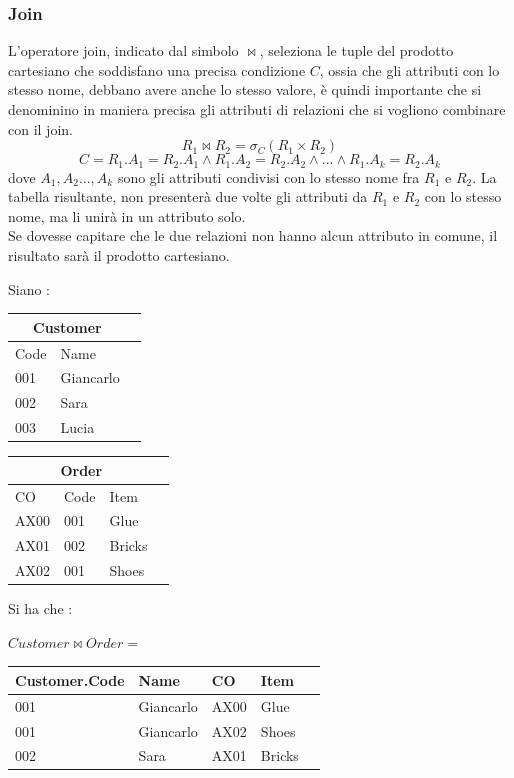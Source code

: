 \documentclass[12pt, letterpaper]{article}
\begin{document}
 \subsubsection{Join}
 L'operatore join, indicato dal simbolo \(\Join \), seleziona le tuple del prodotto cartesiano 
 che soddisfano una precisa condizione \(C\), ossia che gli attributi con lo stesso nome, debbano 
 avere anche lo stesso valore, è quindi importante che si denominino in maniera precisa gli attributi 
 di relazioni che si vogliono combinare con il join.\begin{equation}
    R_1\Join R_2 = \sigma_C(R_1\times R_2)\end{equation}\begin{equation}
    C = R_1.A_1 = R_2.A_1 \land R_1.A_2 = R_2.A_2 \land ... \land R_1.A_k = R_2.A_k 
\end{equation}
dove \(A_1,A_2...,A_k\) sono gli attributi condivisi con lo stesso nome fra \(R_1\) e \(R_2\).
La tabella risultante, non presenterà due volte gli attributi da \(R_1\) e \(R_2\) con lo stesso 
nome, ma li unirà in un attributo solo. \\Se dovesse 
capitare che le due relazioni non hanno alcun attributo in comune, il risultato sarà il prodotto cartesiano.
\begin{center}
    Siano : 
    \begin{tabular}{|l|l|r|}
        \hline
    \multicolumn{2}{|c|}{\textbf{Customer}}\\
        \hline
        Code & Name  \\
        \hline
        001 & Giancarlo  \\
        \hline
        002 & Sara  \\
        \hline
        003 & Lucia  \\
        \hline
        \end{tabular}
        \begin{tabular}{|l|l|l|r|}
            \hline
        \multicolumn{3}{|c|}{\textbf{Order}}\\
            \hline
            CO & Code & Item  \\
            \hline
            AX00 & 001 & Glue \\
            \hline
            AX01 & 002 & Bricks \\
            \hline
            AX02 & 001 & Shoes \\
            \hline
            \end{tabular}
 Si ha che :\end{center}\begin{center}
    \(Customer\Join Order =\)
    \begin{tabular}{|l|l|l|l|r|}
        \hline
        Customer.Code & Name & CO & Item  \\
        \hline
        001 & Giancarlo & AX00 & Glue \\\hline
        001 & Giancarlo & AX02 & Shoes \\\hline
        002 & Sara & AX01 & Bricks \\
        \hline
        \end{tabular}
 \end{center}
\end{document}
